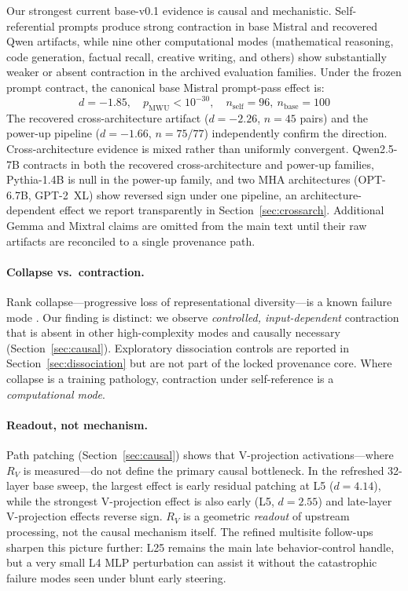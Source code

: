 \documentclass{article}
\newcommand{\RV}{R_V}
\newcommand{\dcohen}{d}
\begin{document}
Our strongest current base-v0.1 evidence is causal and mechanistic.
Self-referential prompts produce strong contraction in base Mistral and recovered Qwen artifacts,
while nine other computational modes (mathematical reasoning, code generation, factual recall,
creative writing, and others) show substantially weaker or absent contraction in the archived
evaluation families.
Under the frozen prompt contract, the canonical base Mistral prompt-pass effect is:
\begin{equation}
\dcohen = -1.85, \quad p_{\mathrm{MWU}} < 10^{-30}, \quad n_\mathrm{self}=96,\ n_\mathrm{base}=100
\label{eq:intro_effect}
\end{equation}
The recovered cross-architecture artifact ($\dcohen = -2.26$, $n = 45$ pairs) and the power-up
pipeline ($\dcohen = -1.66$, $n = 75/77$) independently confirm the direction.
Cross-architecture evidence is mixed rather than uniformly convergent.
Qwen2.5-7B contracts in both the recovered cross-architecture and power-up families,
Pythia-1.4B is null in the power-up family, and two MHA architectures (OPT-6.7B, GPT-2~XL)
show reversed sign under one pipeline, an architecture-dependent effect we report
transparently in Section~\ref{sec:crossarch}.
Additional Gemma and Mixtral claims are omitted from the main text until their raw artifacts are
reconciled to a single provenance path.

\paragraph{Collapse vs.\ contraction.}
Rank collapse---progressive loss of representational diversity---is a known failure mode
\citep{noci2022signal, dong2021attention, hong2024variance, giorlandino2025two}.
Our finding is distinct: we observe \emph{controlled, input-dependent} contraction that is
absent in other high-complexity modes and causally necessary (Section~\ref{sec:causal}).
Exploratory dissociation controls are reported in Section~\ref{sec:dissociation} but are not part
of the locked provenance core.
Where collapse is a training pathology, contraction under self-reference is a
\emph{computational mode}.

\paragraph{Readout, not mechanism.}
Path patching (Section~\ref{sec:causal}) shows that V-projection activations---where
$\RV$ is measured---do not define the primary causal bottleneck.
In the refreshed 32-layer base sweep, the largest effect is early residual patching at L5
($\dcohen = 4.14$), while the strongest V-projection effect is also early (L5, $\dcohen = 2.55$)
and late-layer V-projection effects reverse sign.
$\RV$ is a geometric \emph{readout} of upstream processing, not the causal mechanism itself.
The refined multisite follow-ups sharpen this picture further: L25 remains the main late
behavior-control handle, but a very small L4 MLP perturbation can assist it without the
catastrophic failure modes seen under blunt early steering.
\end{document}
